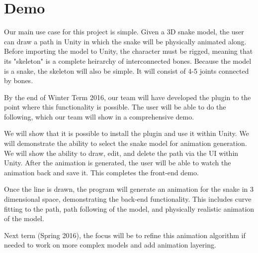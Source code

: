 \section{Demo}
Our main use case for this project is simple. Given a 3D snake model, the user can draw a path in Unity in which the snake will be physically animated along. Before importing the model to Unity, the character must be rigged, meaning that its "skeleton" is a complete heirarchy of interconnected bones. Because the model is a snake, the skeleton will also be simple. It will consist of 4-5 joints connected by bones.

By the end of Winter Term 2016, our team will have developed the plugin to the point where this functionality is possible. The user will be able to do the following, which our team will show in a comprehensive demo. 

We will show that it is possible to install the plugin and use it within Unity. We will demonstrate the ability to select the snake model for animation generation. We will show the ability to draw, edit, and delete the path via the UI within Unity. After the animation is generated, the user will be able to watch the animation back and save it. This completes the front-end demo.

Once the line is drawn, the program will generate an animation for the snake in 3 dimensional space, demonstrating the back-end functionality. This includes curve fitting to the path, path following of the model, and physically realistic animation of the model.

Next term (Spring 2016), the focus will be to refine this animation algorithm if needed to work on more complex models and add animation layering.

